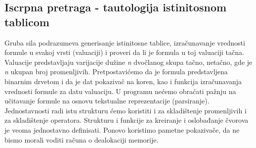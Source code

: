 \documentclass{article}
\begin{document}
\subsection{Iscrpna pretraga - tautologija istinitosnom tablicom}
Gruba sila podrazumeva generisanje
istinitosne tablice, izračunavanje vrednosti formule u svakoj vrsti (valuaciji) i
proveri da li je formula u toj valuaciji tačna. Valuacije predstavljaju varijacije
dužine \textit{n} dvočlanog skupa tačno, netačno, gde je \textit{n} ukupan broj promenljivih.
\newline
Pretpostavićemo da je formula predstavljena
binarnim drvetom i da je dat pokazivač na koren, kao i funkcija izračunavanja
vrednosti formule za datu valuaciju. U programu nećemo obraćati pažnju na
učitavanje formule na osnovu tekstualne reprezentacije (parsiranje).
Jednostavnosti radi istu strukturu ćemo koristiti i za skladištenje promenljivih i
za skladištenje operatora. Strukturu i funkcije za kreiranje i oslobađanje čvorova
je veoma jednostavno definisati. Ponovo koristimo pametne pokazivače, da ne
bismo morali voditi računa o dealokaciji memorije.
\end{document}
